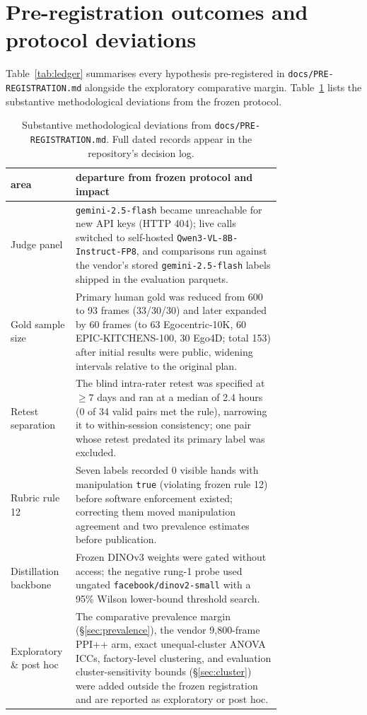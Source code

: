 \documentclass[11pt]{article}
\begin{document}
\appendix

\section{Pre-registration outcomes and protocol deviations}
\label{app:prereg}

Table~\ref{tab:ledger} summarises every hypothesis pre-registered in
\texttt{docs/PRE-REGISTRATION.md} alongside the exploratory comparative margin. Table~\ref{tab:dev}
lists the substantive methodological deviations from the frozen protocol.

\begin{table}[h]
\centering\footnotesize

\caption{Complete slate of pre-registered hypotheses, thresholds, observed outcomes, and the
exploratory comparative margin.}
\label{tab:ledger}
\end{table}

\begin{table}[h]
\centering\footnotesize
\begin{tabular}{@{}lp{0.76\linewidth}@{}}
\toprule
area & departure from frozen protocol and impact \\
\midrule
Judge panel & \texttt{gemini-2.5-flash} became unreachable for new API keys (HTTP 404); live calls
switched to self-hosted \texttt{Qwen3-VL-8B-Instruct-FP8}, and comparisons run against the
vendor's stored \texttt{gemini-2.5-flash} labels shipped in the evaluation parquets. \\
Gold sample size & Primary human gold was reduced from 600 to 93 frames (33/30/30) and later
expanded by 60 frames (to 63 Egocentric-10K, 60 EPIC-KITCHENS-100, 30 Ego4D; total 153) after
initial results were public, widening intervals relative to the original plan. \\
Retest separation & The blind intra-rater retest was specified at $\geq 7$ days and ran at a
median of 2.4 hours (0 of 34 valid pairs met the rule), narrowing it to within-session
consistency; one pair whose retest predated its primary label was excluded. \\
Rubric rule 12 & Seven labels recorded 0 visible hands with manipulation \texttt{true} (violating
frozen rule 12) before software enforcement existed; correcting them moved manipulation agreement
and two prevalence estimates before publication. \\
Distillation backbone & Frozen DINOv3 weights were gated without access; the negative rung-1 probe
used ungated \texttt{facebook/dinov2-small} with a 95\% Wilson lower-bound threshold search. \\
Exploratory \& post hoc & The comparative prevalence margin (\S\ref{sec:prevalence}), the vendor
9{,}800-frame PPI++ arm, exact unequal-cluster ANOVA ICCs, factory-level clustering, and
evaluation cluster-sensitivity bounds (\S\ref{sec:cluster}) were added outside the frozen
registration and are reported as exploratory or post hoc. \\
\bottomrule
\end{tabular}
\caption{Substantive methodological deviations from \texttt{docs/PRE-REGISTRATION.md}. Full dated
records appear in the repository's decision log.}
\label{tab:dev}
\end{table}
\end{document}
